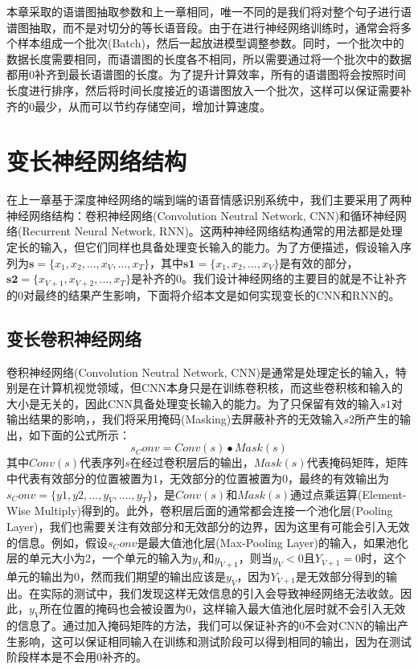 本章采取的语谱图抽取参数和上一章相同，唯一不同的是我们将对整个句子进行语谱图抽取，而不是对切分的等长语音段。由于在进行神经网络训练时，通常会将多个样本组成一个批次(Batch)，然后一起放进模型调整参数。同时，一个批次中的数据长度需要相同，而语谱图的长度各不相同，所以需要通过将一个批次中的数据都用0补齐到最长语谱图的长度。为了提升计算效率，所有的语谱图将会按照时间长度进行排序，然后将时间长度接近的语谱图放入一个批次，这样可以保证需要补齐的0最少，从而可以节约存储空间，增加计算速度。

\section{变长神经网络结构}
\label{sec:var_len_nn}

在上一章基于深度神经网络的端到端的语音情感识别系统中，我们主要采用了两种神经网络结构：卷积神经网络(Convolution Neutral Network, CNN)和循环神经网络(Recurrent Neural Network, RNN)。这两种神经网络结构通常的用法都是处理定长的输入，但它们同样也具备处理变长输入的能力。为了方便描述，假设输入序列为$\mathbf{s} = \{x_1, x_2,...,x_V,...,x_T\}$，其中$\mathbf{s1} = \{x_1, x_2,...,x_V\}$是有效的部分，$\mathbf{s2} = \{x_{V+1}, x_{V+2},...,x_T\}$是补齐的0。我们设计神经网络的主要目的就是不让补齐的0对最终的结果产生影响，下面将介绍本文是如何实现变长的CNN和RNN的。

\subsection{变长卷积神经网络}
\label{ssec:var_len_cnn}

卷积神经网络(Convolution Neutral Network, CNN)是通常是处理定长的输入，特别是在计算机视觉领域，但CNN本身只是在训练卷积核，而这些卷积核和输入的大小是无关的，因此CNN具备处理变长输入的能力。为了只保留有效的输入$s1$对输出结果的影响，，我们将采用掩码(Masking)去屏蔽补齐的无效输入$s2$所产生的输出，如下面的公式所示：
\begin{equation}
\label{equ:cnn_mask}
    s_Conv = Conv(s) \bullet Mask(s)
\end{equation}
其中$Conv(s)$代表序列$s$在经过卷积层后的输出，$Mask(s)$代表掩码矩阵，矩阵中代表有效部分的位置被置为1，无效部分的位置被置为0，最终的有效输出为$s_Conv=\{y1,y2,...,y_V,....,y_T\}$，是$Conv(s)$和$Mask(s)$通过点乘运算(Element-Wise Multiply)得到的。此外，卷积层后面的通常都会连接一个池化层(Pooling Layer)，我们也需要关注有效部分和无效部分的边界，因为这里有可能会引入无效的信息。例如，假设$s_Conv$是最大值池化层(Max-Pooling Layer)的输入，如果池化层的单元大小为2，一个单元的输入为$y_V$和$y_{V+1}$，则当$y_V<0$且$Y_{V+1}=0$时，这个单元的输出为0，然而我们期望的输出应该是$y_V$，因为$Y_{V+1}$是无效部分得到的输出。在实际的测试中，我们发现这样无效信息的引入会导致神经网络无法收敛。因此，$y_V$所在位置的掩码也会被设置为0，这样输入最大值池化层时就不会引入无效的信息了。通过加入掩码矩阵的方法，我们可以保证补齐的0不会对CNN的输出产生影响，这可以保证相同输入在训练和测试阶段可以得到相同的输出，因为在测试阶段样本是不会用0补齐的。

